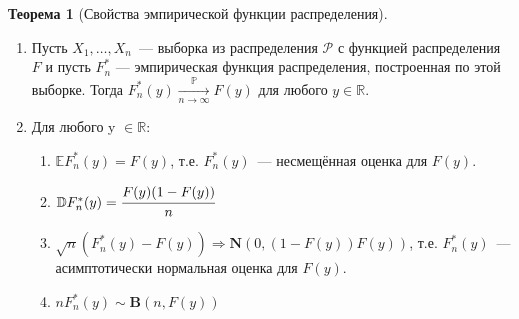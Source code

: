 \documentclass[oneside,final,14pt]{extreport}
\theoremstyle{plain}
\theoremstyle{definition}
\theoremstyle{named}
\newtheorem*{namedthm}{Теорема}
\begin{document}
\begin{namedthm}[Свойства эмпирической функции распределения]\leavevmode
\begin{enumerate}
    \item Пусть $X_{1}, \ldots, X_{n}$~--- выборка из распределения $\mathcal{P}$ с функцией распределения $F$ и пусть $F_{n}^{*}$ — эмпирическая функция распределения, построенная по этой выборке. Тогда $F_{n}^{*}(y) \xrightarrow[n \to \infty]{\mathbb{P}} F(y)$ для любого $y \in \mathbb{R}.$
    \item Для любого y $\in \mathbb{R}$:
    \begin{enumerate}[label={\arabic*)}]
        \item $\mathbb{E} F_{n}^{*}(y)=F(y)$, т.е. $F_{n}^{*}(y)$~--- несмещённая оценка для $F(y)$.
        \item $\mathbb{D} F_{n}^{*}(y)=\cfrac{F(y)(1-F(y))}{n}$
        \item $\sqrt{n}(F_{n}^{*}(y)-F(y)) \Rightarrow \mathbf{N}(0, (1-F(y))F(y))$, т.е. $F_{n}^{*}(y)$~--- асимптотически нормальная оценка для $F(y)$.
        \item $n F_{n}^{*}(y) \sim \mathbf{B}(n, F(y))$
    \end{enumerate}
\end{enumerate}
\end{namedthm}
\pagebreak
\end{document}
